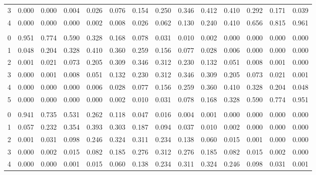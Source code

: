 \documentclass[
]{article}
\begin{document}
\begin{table}[H]
\begin{tabular}{lrrrrrrrrrrrrr}
\hspace{1em}3 & 0.000 & 0.000 & 0.004 & 0.026 & 0.076 & 0.154 & 0.250 & 0.346 & 0.412 & 0.410 & 0.292 & 0.171 & 0.039\\
\hspace{1em}4 & 0.000 & 0.000 & 0.000 & 0.002 & 0.008 & 0.026 & 0.062 & 0.130 & 0.240 & 0.410 & 0.656 & 0.815 & 0.961\\
\addlinespace[0.3em]
\multicolumn{14}{l}{$n=5$}\\
\hspace{1em}0 & 0.951 & 0.774 & 0.590 & 0.328 & 0.168 & 0.078 & 0.031 & 0.010 & 0.002 & 0.000 & 0.000 & 0.000 & 0.000\\
\hspace{1em}1 & 0.048 & 0.204 & 0.328 & 0.410 & 0.360 & 0.259 & 0.156 & 0.077 & 0.028 & 0.006 & 0.000 & 0.000 & 0.000\\
\hspace{1em}2 & 0.001 & 0.021 & 0.073 & 0.205 & 0.309 & 0.346 & 0.312 & 0.230 & 0.132 & 0.051 & 0.008 & 0.001 & 0.000\\
\hspace{1em}3 & 0.000 & 0.001 & 0.008 & 0.051 & 0.132 & 0.230 & 0.312 & 0.346 & 0.309 & 0.205 & 0.073 & 0.021 & 0.001\\
\hspace{1em}4 & 0.000 & 0.000 & 0.000 & 0.006 & 0.028 & 0.077 & 0.156 & 0.259 & 0.360 & 0.410 & 0.328 & 0.204 & 0.048\\
\hspace{1em}5 & 0.000 & 0.000 & 0.000 & 0.000 & 0.002 & 0.010 & 0.031 & 0.078 & 0.168 & 0.328 & 0.590 & 0.774 & 0.951\\
\addlinespace[0.3em]
\multicolumn{14}{l}{$n=6$}\\
\hspace{1em}0 & 0.941 & 0.735 & 0.531 & 0.262 & 0.118 & 0.047 & 0.016 & 0.004 & 0.001 & 0.000 & 0.000 & 0.000 & 0.000\\
\hspace{1em}1 & 0.057 & 0.232 & 0.354 & 0.393 & 0.303 & 0.187 & 0.094 & 0.037 & 0.010 & 0.002 & 0.000 & 0.000 & 0.000\\
\hspace{1em}2 & 0.001 & 0.031 & 0.098 & 0.246 & 0.324 & 0.311 & 0.234 & 0.138 & 0.060 & 0.015 & 0.001 & 0.000 & 0.000\\
\hspace{1em}3 & 0.000 & 0.002 & 0.015 & 0.082 & 0.185 & 0.276 & 0.312 & 0.276 & 0.185 & 0.082 & 0.015 & 0.002 & 0.000\\
\hspace{1em}4 & 0.000 & 0.000 & 0.001 & 0.015 & 0.060 & 0.138 & 0.234 & 0.311 & 0.324 & 0.246 & 0.098 & 0.031 & 0.001\\

\end{tabular}
\end{table}
\end{document}
